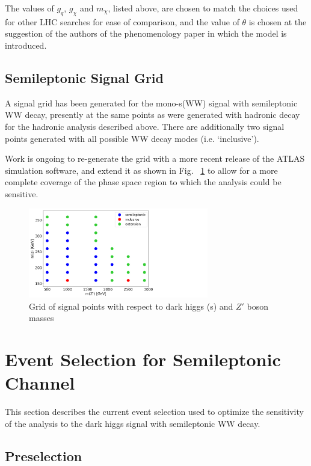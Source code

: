 \documentclass[12pt]{article}
\begin{document}
The values of $g_q$, $g_\chi$ and $m_\chi$, listed above, are chosen to match the choices used for other LHC searches for ease of comparison, and the value of $\theta$ is chosen at the suggestion of the authors of the phenomenology paper \cite{dark_higgs} in which the model is introduced. 

\subsection{Semileptonic Signal Grid}

A signal grid has been generated for the mono-s(WW) signal with semileptonic WW decay, presently at the same points as were generated with hadronic decay for the hadronic analysis described above. There are additionally two signal points generated with all possible WW decay modes (i.e. `inclusive'). 

Work is ongoing to re-generate the grid with a more recent release of the ATLAS simulation software, and extend it as shown in Fig. ~\ref{fig:signalgrid} to allow for a more complete coverage of the phase space region to which the analysis could be sensitive.

\begin{figure}[H]
	\centering
	\includegraphics[width=0.7\textwidth]{figures/SignalGrid_simple.png}
	\caption[]{Grid of signal points with respect to dark higgs (s) and $Z'$ boson masses}
	\label{fig:signalgrid}
\end{figure}

\section{Event Selection for Semileptonic Channel}

This section describes the current event selection used to optimize the sensitivity of the analysis to the dark higgs signal with semileptonic WW decay. 

\subsection{Preselection}
\end{document}
